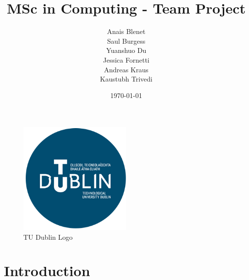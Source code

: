 \documentclass{report}
\begin{document}
\begin{figure}
    \centering
    \includegraphics[width=0.5\textwidth]{Figures/tud_logo.png}
    \caption{TU Dublin Logo}    
\end{figure}
\title{MSc in Computing - Team Project}
\author{Anais Blenet\\Saul Burgess\\Yuanshuo Du\\Jessica Fornetti\\Andreas Kraus\\Kaustubh Trivedi}
\date{\today}

\renewcommand{\cfttoctitlefont}{\hfill\Huge\bfseries} %
\renewcommand{\cftaftertoctitle}{\hfill}

\maketitle %

\tableofcontents
\newpage

\chapter{Introduction}
\end{document}
